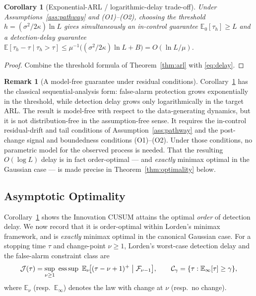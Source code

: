 \documentclass[bj,authoryear]{imsart}
\theoremstyle{plain}
\newtheorem{corollary}[theorem]{Corollary}
\theoremstyle{definition}
\newtheorem{remark}{Remark}[section]
\newcommand{\E}{\mathbb{E}}
\newcommand{\F}{\mathcal{F}}
\begin{document}
\begin{corollary}[Exponential-ARL / logarithmic-delay trade-off]
\label{cor:tradeoff}
  Under Assumptions~\ref{ass:pathway} and (O1)--(O2), choosing the threshold
  $h=(\sigma^2/2\kappa)\ln L$ gives simultaneously an in-control
  guarantee $\E_0[\tau_h]\geq L$ and a detection-delay guarantee
  $\E[\tau_h-\tau\mid\tau_h>\tau]\leq\mu^{-1}\bigl((\sigma^2/2\kappa)\ln L+B\bigr)
   =O(\ln L/\mu)$.
\end{corollary}

\begin{proof}
  Combine the threshold formula of Theorem~\ref{thm:arl} with
  \eqref{eq:delay}.
\end{proof}

\begin{remark}[A model-free guarantee under residual conditions]
  Corollary~\ref{cor:tradeoff} has the classical sequential-analysis form:
  false-alarm protection grows exponentially in the threshold, while
  detection delay grows only logarithmically in the target ARL.  The result
  is model-free with respect to the data-generating dynamics, but it is not
  distribution-free in the assumption-free sense.  It requires the
  in-control residual-drift and tail conditions of
  Assumption~\ref{ass:pathway} and the post-change signal and boundedness
  conditions (O1)--(O2).  Under those conditions, no parametric model for the
  observed process is needed.  That the resulting $O(\log L)$ delay is in fact
  order-optimal --- and \emph{exactly} minimax optimal in the Gaussian
  case --- is made precise in Theorem~\ref{thm:optimality} below.
\end{remark}

\subsection{Asymptotic Optimality}
\label{sec:optimality}

Corollary~\ref{cor:tradeoff} shows the Innovation CUSUM attains the optimal
\emph{order} of detection delay.  We now record that it is
order-optimal within Lorden's minimax framework, and is \emph{exactly}
minimax optimal in the canonical Gaussian case.  For a stopping time $\tau$ and change-point
$\nu\geq1$, Lorden's worst-case detection delay and the false-alarm
constraint class are
\[
  \mathcal J(\tau)
  =\sup_{\nu\geq1}\ \operatorname*{ess\,sup}\
    \E_\nu\!\bigl[(\tau-\nu+1)^+\bigm|\F_{\nu-1}\bigr],
  \qquad
  \mathcal C_\gamma=\{\tau:\E_\infty[\tau]\geq\gamma\},
\]
where $\E_\nu$ (resp.\ $\E_\infty$) denotes the law with change at $\nu$
(resp.\ no change).
\end{document}
